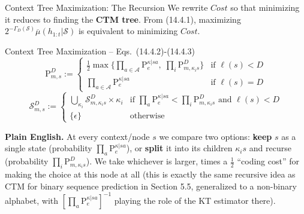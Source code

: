 \documentclass[aspectratio=169,10pt]{beamer}
\newcommand{\Sc}{\mathcal{S}}
\newcommand{\Ac}{\mathcal{A}}
\begin{document}
\begin{frame}{Context Tree Maximization: The Recursion}
  We rewrite $\mathit{Cost}$ so that minimizing it reduces to finding the
  \textbf{CTM tree}. From (14.4.1), maximizing $2^{-\Gamma_D(\Sc)}\overline\mu(h_{1:t}|\Sc)$
  is equivalent to minimizing $\mathit{Cost}$.
  \begin{block}{Context Tree Maximization -- Eqs.\ (14.4.2)-(14.4.3)}
    \[
      \mathrm{P}^D_{m,s} := \begin{cases}
        \frac12\max\Big\{\prod_{a\in\Ac}\mathrm{P}_e^{\kappa|sa},\;\prod_i \mathrm{P}^D_{m,\kappa_i s}\Big\} & \text{if } \ell(s)<D\\[4pt]
        \prod_{a\in\Ac}\mathrm{P}_e^{\kappa|sa} & \text{if } \ell(s)=D
      \end{cases}
    \]
    \[
      \Sc^D_{m,s} := \begin{cases}
        \bigcup_{\kappa_i}\Sc^D_{m,\kappa_is}\times\kappa_i & \text{if } \prod_a\mathrm{P}_e^{\kappa|sa} < \prod_i \mathrm{P}^D_{m,\kappa_is} \text{ and } \ell(s)<D\\
        \{\epsilon\} & \text{otherwise}
      \end{cases}
    \]
  \end{block}
  \textbf{Plain English.} At every context/node $s$ we compare two
  options: \textbf{keep} $s$ as a single state (probability
  $\prod_a\mathrm{P}_e^{\kappa|sa}$), or \textbf{split} it into its
  children $\kappa_is$ and recurse (probability
  $\prod_i \mathrm{P}^D_{m,\kappa_is}$). We take whichever is larger, times
  a $\tfrac12$ ``coding cost'' for making the choice at this node at all
  (this is exactly the same recursive idea as CTM for binary sequence
  prediction in Section 5.5, generalized to a non-binary alphabet, with
  $[\prod_a\mathrm{P}_e^{\kappa|sa}]^{-1}$ playing the role of the KT
  estimator there).
\end{frame}
\end{document}
